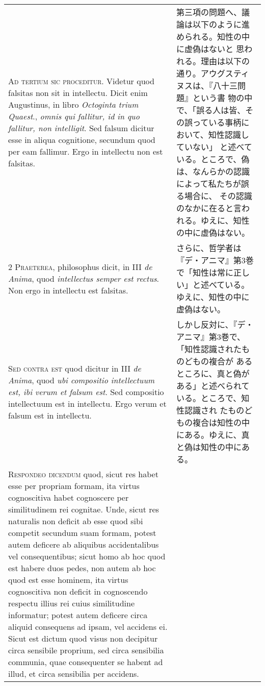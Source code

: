 \documentclass[paper=a4paper,fontsize=10pt,jafontsize=9pt,titlepage]{jlreq}
\begin{document}
\begin{longtable}{p{21em}p{21em}}

{\huge A}{\scshape d tertium sic proceditur}. Videtur quod falsitas non
sit in intellectu. Dicit enim Augustinus, in libro {\itshape Octoginta
trium Quaest}., {\itshape omnis qui fallitur, id in quo fallitur, non
intelligit}. Sed falsum dicitur esse in aliqua cognitione, secundum quod
per eam fallimur. Ergo in intellectu non est falsitas.


&

 第三項の問題へ、議論は以下のように進められる。知性の中に虚偽はないと
思われる。理由は以下の通り。アウグスティヌスは、『八十三問題』という書
物の中で、「誤る人は皆、その誤っている事柄において、知性認識していない」
と述べている。ところで、偽は、なんらかの認識によって私たちが誤る場合に、
その認識のなかに在ると言われる。ゆえに、知性の中に虚偽はない。

\\


{\scshape 2 Praeterea}, philosophus dicit, in III {\itshape de Anima},
quod {\itshape intellectus semper est rectus}. Non ergo in intellectu
est falsitas.


&

さらに、哲学者は『デ・アニマ』第3巻で「知性は常に正しい」と述べている。
 ゆえに、知性の中に虚偽はない。


\\


{\scshape Sed contra est} quod dicitur in III {\itshape de Anima},
quod {\itshape ubi compositio intellectuum est, ibi verum et falsum
est}. Sed compositio intellectuum est in intellectu. Ergo verum et
falsum est in intellectu.


&

しかし反対に、『デ・アニマ』第3巻で、「知性認識されたものどもの複合が
 あるところに、真と偽がある」と述べられている。ところで、知性認識され
 たものどもの複合は知性の中にある。ゆえに、真と偽は知性の中にある。


\\


{\scshape Respondeo dicendum} quod, sicut res habet esse
per propriam formam, ita virtus cognoscitiva habet cognoscere per
similitudinem rei cognitae. Unde, sicut res naturalis non deficit ab
esse quod sibi competit secundum suam formam, potest autem deficere ab
aliquibus accidentalibus vel consequentibus; sicut homo ab hoc quod est
habere duos pedes, non autem ab hoc quod est esse hominem, ita virtus
cognoscitiva non deficit in cognoscendo respectu illius rei cuius
similitudine informatur; potest autem deficere circa aliquid consequens
ad ipsam, vel accidens ei. Sicut est dictum quod visus non decipitur
circa sensibile proprium, sed circa sensibilia communia, quae
consequenter se habent ad illud, et circa sensibilia per accidens. 


\end{longtable}
\end{document}
